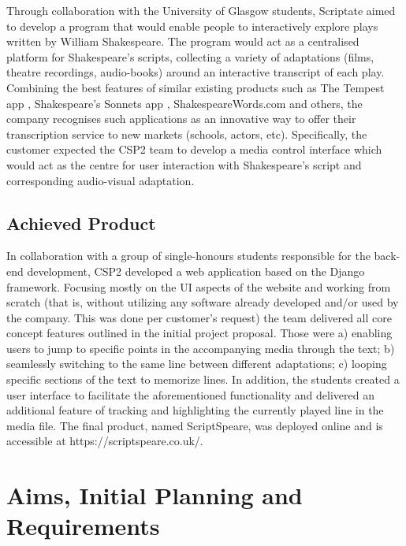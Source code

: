 \documentclass{l3proj}
\begin{document}
Through collaboration with the University of Glasgow students, Scriptate aimed to develop a program that would enable people to interactively explore plays written by William Shakespeare. The program would act as a centralised platform for Shakespeare’s scripts, collecting a variety of adaptations (films, theatre recordings, audio-books) around an interactive transcript of each play. Combining the best features of similar existing products such as The Tempest app \cite{heuristics}, Shakespeare’s Sonnets app \cite{ssonnets}, ShakespeareWords.com \cite{swords} and others, the company recognises such applications as an innovative way to offer their transcription service to new markets (schools, actors, etc). Specifically, the customer expected the CSP2 team to develop a media control interface which would act as the centre for user interaction with Shakespeare’s script and corresponding audio-visual adaptation.

\subsection{Achieved Product}

In collaboration with a group of single-honours students responsible for the back-end development, CSP2 developed a web application based on the Django framework. Focusing mostly on the UI aspects of the website and working from scratch (that is, without utilizing any software already developed and/or used by the company. This was done per customer’s request) the team delivered all core concept features outlined in the initial project proposal. Those were a) enabling users to jump to specific points in the accompanying media through the text; b) seamlessly switching to the same line between different adaptations; c) looping specific sections of the text to memorize lines. In addition, the students created a user interface to facilitate the aforementioned functionality and delivered an additional feature of tracking and highlighting the currently played line in the media file. The final product, named ScriptSpeare, was deployed online and is accessible at https://scriptspeare.co.uk/.



\iffalse

\section{Aims, Initial Planning and Requirements}
\end{document}
